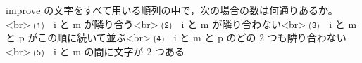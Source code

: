 $\mathrm{improve}$ の文字をすべて用いる順列の中で，次の場合の数は何通りあるか。<br>
⑴　$\mathrm{i}$ と $\mathrm{m}$ が隣り合う<br>
⑵　$\mathrm{i}$ と $\mathrm{m}$ が隣り合わない<br>
⑶　$\mathrm{i}$ と $\mathrm{m}$ と $\mathrm{p}$ がこの順に続いて並ぶ<br>
⑷　$\mathrm{i}$ と $\mathrm{m}$ と $\mathrm{p}$ のどの $2$ つも隣り合わない<br>
⑸　$\mathrm{i}$ と $\mathrm{m}$ の間に文字が $2$ つある